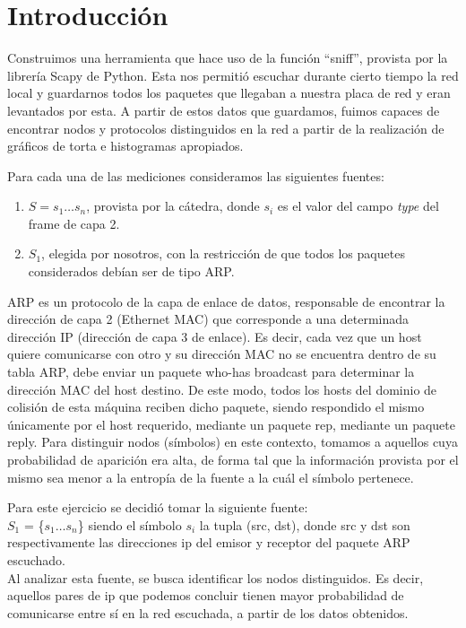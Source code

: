 \documentclass[final,narroweqnarray,inline]{ieee}
\begin{document}
%
\section{ Introducción }

Construimos una herramienta que hace uso de la
función ``sniff'', provista por la librería Scapy de Python. Esta nos permitió escuchar durante
cierto tiempo la red local y guardarnos todos los paquetes que llegaban a
nuestra placa de red y eran levantados por esta. A partir de estos datos
que guardamos, fuimos capaces de encontrar  nodos y protocolos
distinguidos en la red a partir de la realización de gráficos de torta e histogramas apropiados.

Para cada una de las mediciones consideramos las siguientes fuentes: 
\begin{enumerate}
  \item $S = {s_{1} \dots s_{n}}$, provista por la cátedra, donde $s_{i}$ es el valor del campo
        \emph{type} del frame de capa 2. 
  \item $S_{1}$, elegida por nosotros, con la restricción de que todos los paquetes considerados
        debían ser de tipo ARP.
\end{enumerate}

ARP es un protocolo de la capa de enlace de datos, responsable de encontrar
la dirección de capa 2 (Ethernet MAC) que corresponde a una determinada
dirección IP (dirección de capa 3 de enlace). Es decir, cada vez que un host
quiere comunicarse con otro y su dirección MAC no se encuentra dentro de su
tabla ARP, debe enviar un paquete who-has broadcast para determinar la dirección MAC
del host destino. De este modo, todos los hosts del dominio de colisión de
esta máquina reciben dicho paquete, siendo respondido el mismo únicamente
por el host requerido, mediante un paquete rep, mediante un paquete reply.
Para distinguir nodos (símbolos) en este contexto, tomamos a aquellos cuya
probabilidad de aparición era alta, de forma tal que la información provista
por el mismo sea menor a la entropía de la fuente a la cuál el símbolo
pertenece.

\medskip
Para este ejercicio se decidi\'o tomar la siguiente fuente: \\ 
$S_{1}$ = \{$s_{1} \dots s_{n}$\} siendo el símbolo $s_{i}$ la tupla (src, dst), donde
src y dst son respectivamente las direcciones ip del emisor y receptor del
paquete ARP escuchado.  \\
Al analizar esta fuente, se busca identificar los nodos distinguidos. Es
decir, aquellos pares de ip que podemos concluir tienen mayor probabilidad de comunicarse
entre sí en la red escuchada, a partir de los datos obtenidos. 
\end{document}
